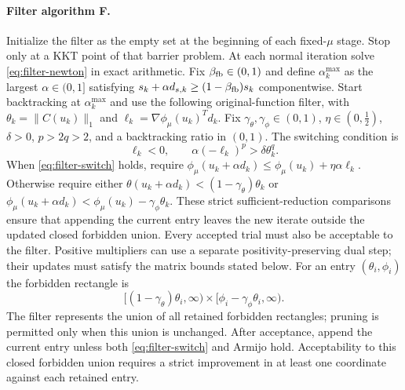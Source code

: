\documentclass[pdflatex,sn-mathphys-num]{sn-jnl}
\theoremstyle{thmstyleone}
\theoremstyle{thmstylethree}
\newcounter{algorithm}
\begin{document}
\paragraph{Filter algorithm F.}
Initialize the filter as the empty set at the beginning of each fixed-$\mu$
stage. Stop only at a KKT point of that barrier problem.
At each normal iteration solve \eqref{eq:filter-newton} in exact
arithmetic. Fix $\beta_{\rm fb}\in(0,1)$ and define $\alpha_k^{\max}$
as the largest $\alpha\in(0,1]$ satisfying
$s_k+\alpha d_{s,k}\geq(1-\beta_{\rm fb})s_k$ componentwise.
Start backtracking at $\alpha_k^{\max}$ and use
the following original-function filter, with
$\theta_k=\|C(u_k)\|_1$ and
$\ell_k=\nabla\phi_\mu(u_k)^Td_k$.
Fix $\gamma_\theta,\gamma_\phi\in(0,1)$,
$\eta\in(0,\tfrac12)$, $\delta>0$,
$p>2q>2$, and a backtracking ratio in $(0,1)$.
The switching condition is
\begin{equation}
 \ell_k<0,\qquad
 \alpha(-\ell_k)^p>\delta\theta_k^q .
 \label{eq:filter-switch}
\end{equation}
When \eqref{eq:filter-switch} holds, require
$\phi_\mu(u_k+\alpha d_k)
 \leq\phi_\mu(u_k)+\eta\alpha\ell_k$.
Otherwise require either
$\theta(u_k+\alpha d_k)<(1-\gamma_\theta)\theta_k$
or
$\phi_\mu(u_k+\alpha d_k)
 <\phi_\mu(u_k)-\gamma_\phi\theta_k$.
These strict sufficient-reduction comparisons ensure that appending
the current entry leaves the new iterate outside the updated
closed forbidden union.
Every accepted trial must also be acceptable to the filter.
Positive multipliers can use a separate positivity-preserving dual
step; their updates must satisfy the matrix bounds stated below.
For an entry $(\theta_i,\phi_i)$ the forbidden rectangle is
\begin{equation}
 [ (1-\gamma_\theta)\theta_i,\infty)
 \times[\phi_i-\gamma_\phi\theta_i,\infty).
 \label{eq:filter-forbidden}
\end{equation}
The filter represents the union of all retained forbidden rectangles;
pruning is permitted only when this union is unchanged.
After acceptance, append the current entry unless both
\eqref{eq:filter-switch} and Armijo hold.
Acceptability to this closed forbidden union requires a strict
improvement in at least one coordinate against each retained entry.
\end{document}
